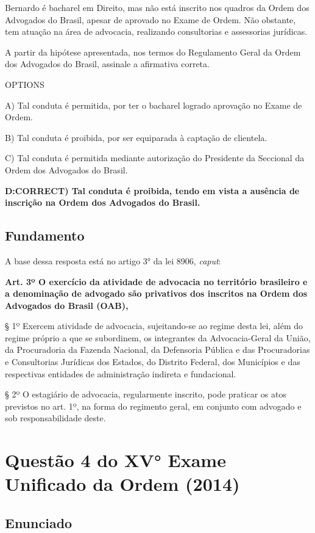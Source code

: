 \documentclass[12pt]{article}
\begin{document}
Bernardo é bacharel em Direito, mas não está inscrito nos 
quadros da Ordem dos Advogados do Brasil, apesar de 
aprovado no Exame de Ordem. Não obstante, tem atuação na 
área de advocacia, realizando consultorias e assessorias 
jurídicas. 
 
A partir da hipótese apresentada, nos termos do Regulamento 
Geral da Ordem dos Advogados do Brasil, assinale a afirmativa 
correta. 
 
OPTIONS

A) Tal conduta é permitida, por ter o bacharel logrado 
aprovação no Exame de Ordem. 

B) Tal conduta é proibida, por ser equiparada à captação de 
clientela. 

C) Tal conduta é permitida mediante autorização do 
Presidente da Seccional da Ordem dos Advogados do 
Brasil. 

\textbf{D:CORRECT) Tal conduta é proibida, tendo em vista a ausência de inscrição na Ordem dos Advogados do Brasil.}

\subsection{Fundamento}

A base dessa resposta está no artigo 3° da lei 8906, \textit{caput}:

\textbf{Art. 3º O exercício da atividade de advocacia no território brasileiro e a denominação de advogado são privativos dos inscritos na Ordem dos Advogados do Brasil (OAB),}

§ 1º Exercem atividade de advocacia, sujeitando-se ao regime desta lei, além do regime próprio a que se subordinem, os integrantes da Advocacia-Geral da União, da Procuradoria da Fazenda Nacional, da Defensoria Pública e das Procuradorias e Consultorias Jurídicas dos Estados, do Distrito Federal, dos Municípios e das respectivas entidades de administração indireta e fundacional.

§ 2º O estagiário de advocacia, regularmente inscrito, pode praticar os atos previstos no art. 1º, na forma do regimento geral, em conjunto com advogado e sob responsabilidade deste.


\section{Questão 4 do XV° Exame Unificado da Ordem (2014)} 

\subsection{Enunciado} 
\end{document}
